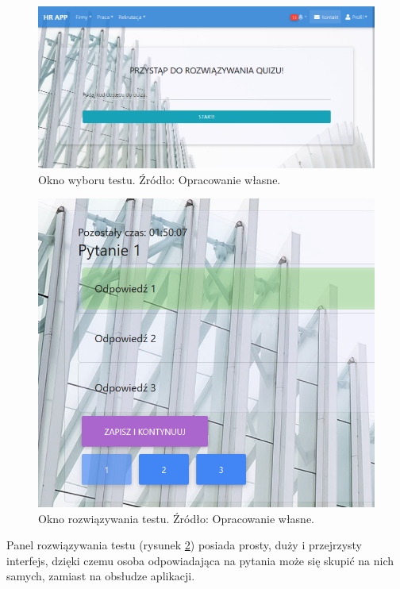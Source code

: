 \documentclass[twoside]{projektInzynierskiMS}
\numberwithin{figure}{section}
\begin{document}
\begin{figure}[h!]
    \centering
    \includegraphics[width = \textwidth]{images/panelQuizu2.png}
    \caption{Okno wyboru testu. Źródło: Opracowanie własne.}
    \label{fig:okno_wyboru_testu}
\end{figure}

\newpage

\begin{figure}[h!]
    \centering
    \includegraphics[width = \textwidth]{images/rozwiązywanieQuizu.png}
    \caption{Okno rozwiązywania testu. Źródło: Opracowanie własne.}
    \label{fig:okno_rozwiązywania_testu}
\end{figure}

Panel rozwiązywania testu (rysunek \ref{fig:okno_rozwiązywania_testu}) posiada prosty, duży i przejrzysty interfejs, dzięki czemu osoba odpowiadająca na pytania może się skupić na nich samych, zamiast na obsłudze aplikacji.
\end{document}
